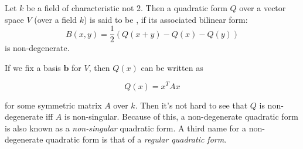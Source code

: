 \documentclass[12pt]{article}
\begin{document}
Let $k$ be a field of characteristic not 2.  Then a quadratic form $Q$ over a vector space $V$ (over a field $k$) is said to be , if its associated bilinear form:
$$B(x,y)=\frac{1}{2}(Q(x+y)-Q(x)-Q(y))$$
is non-degenerate.

If we fix a basis $\boldsymbol{b}$ for $V$, then $Q(x)$ can be written as 

$$Q(x)=x^TAx$$

for some symmetric matrix $A$ over $k$.  Then it's not hard to see that $Q$ is non-degenerate iff $A$ is non-singular.  Because of this, a non-degenerate quadratic form is also known as a \emph{non-singular} quadratic form.  A third name for a non-degenerate quadratic form is that of a \emph{regular quadratic form}.
\end{document}
